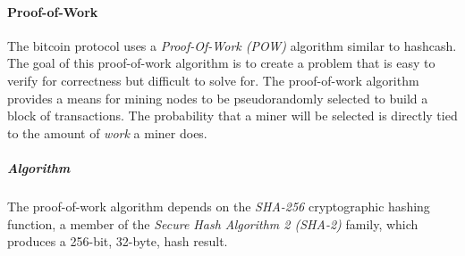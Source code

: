 





\paragraph{Proof-of-Work}
The bitcoin protocol uses a \emph{Proof-Of-Work (POW)} algorithm similar to
hashcash.\cite{hashcash,bitcoin} The goal of this proof-of-work algorithm is to
create a problem that is easy to verify for correctness but difficult to solve
for. The proof-of-work algorithm provides a means for mining nodes to be
pseudorandomly selected to build a block of transactions. The probability that a
miner will be selected is directly tied to the amount of \emph{work} a miner
does.

\subparagraph{Algorithm}
The proof-of-work algorithm depends on the \emph{SHA-256} cryptographic hashing
function, a member of the \emph{Secure Hash Algorithm 2 (SHA-2)} family, which
produces a 256-bit, 32-byte, hash result.

